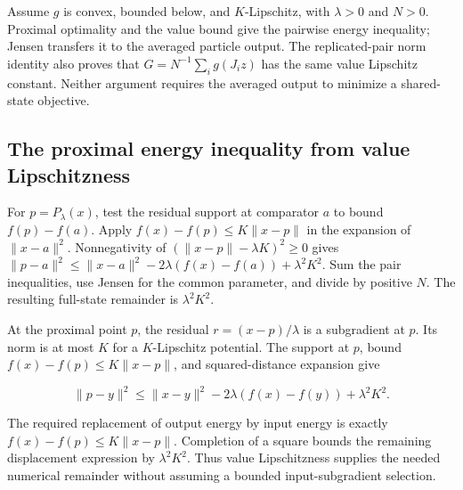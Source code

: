 \documentclass[11pt,a4paper]{report}
\begin{document}
Assume \(g\) is convex, bounded below, and \(K\)-Lipschitz, with \(\lambda>0\) and \(N>0\). Proximal optimality and the value bound give the pairwise energy inequality; Jensen transfers it to the averaged particle output. The replicated-pair norm identity also proves that \(G=N^{-1}\sum_i g(J_i z)\) has the same value Lipschitz constant. Neither argument requires the averaged output to minimize a shared-state objective.

\subsection{\texorpdfstring{The proximal energy inequality from value Lipschitzness}{The proximal energy inequality from value Lipschitzness}}
\label{report-step-ProximalLangevin-SplittingCoupling-lean-1}


For \(p=P_\lambda(x)\), test the residual support at comparator \(a\) to bound \(f(p)-f(a)\). Apply \(f(x)-f(p)\le K\|x-p\|\) in the expansion of \(\|x-a\|^2\). Nonnegativity of \((\|x-p\|-\lambda K)^2\ge0\) gives \(\|p-a\|^2\le\|x-a\|^2-2\lambda(f(x)-f(a))+\lambda^2K^2\). Sum the pair inequalities, use Jensen for the common parameter, and divide by positive \(N\). The resulting full-state remainder is \(\lambda^2K^2\).



At the proximal point \(p\), the residual \(r=(x-p)/\lambda\) is a subgradient at \(p\). Its norm is at most \(K\) for a \(K\)-Lipschitz potential. The support at \(p\), bound \(f(x)-f(p)\le K\|x-p\|\), and squared-distance expansion give

\[\|p-y\|^2\le\|x-y\|^2-2\lambda(f(x)-f(y))+\lambda^2K^2.\]

The required replacement of output energy by input energy is exactly \(f(x)-f(p)\le K\|x-p\|\). Completion of a square bounds the remaining displacement expression by \(\lambda^2K^2\). Thus value Lipschitzness supplies the needed numerical remainder without assuming a bounded input-subgradient selection.
\end{document}
